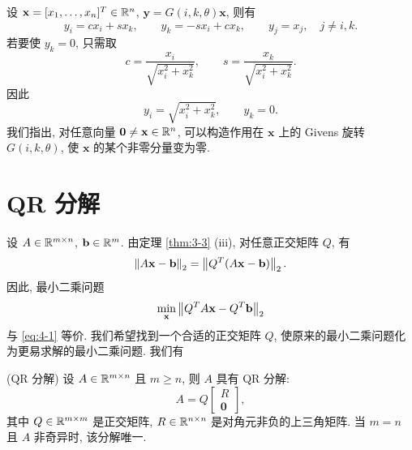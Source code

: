 设 $\mathbf{x}=[x_1,\ldots,x_n]^T\in\mathbb{R}^n$, $\mathbf{y}=G(i,k,\theta)\mathbf{x}$, 则有
\[
  y_i=cx_i+sx_k,\qquad y_k=-sx_i+cx_k,\qquad
  y_j=x_j,\quad j\neq i,k.
\]
若要使 $y_k=0$, 只需取
\[
  c=\frac{x_i}{\sqrt{x_i^2+x_k^2}},\qquad
  s=\frac{x_k}{\sqrt{x_i^2+x_k^2}}.
\]
因此
\[
  y_i=\sqrt{x_i^2+x_k^2},\qquad y_k=0.
\]
我们指出, 对任意向量 $\mathbf{0}\neq\mathbf{x}\in\mathbb{R}^n$, 可以构造作用在 $\mathbf{x}$ 上的 Givens 旋转 $G(i,k,\theta)$, 使 $\mathbf{x}$ 的某个非零分量变为零.

\section{QR 分解}
\label{sec:4-3}

设 $A\in\mathbb{R}^{m\times n}$, $\mathbf{b}\in\mathbb{R}^m$. 由定理 \ref{thm:3-3} (iii), 对任意正交矩阵 $Q$, 有
\[
  \left\|A\mathbf{x}-\mathbf{b}\right\|_2=\left\|Q^T(A\mathbf{x}-\mathbf{b})\right\|_2.
\]
因此, 最小二乘问题
\[
  \min_{\mathbf{x}}\left\|Q^TA\mathbf{x}-Q^T\mathbf{b}\right\|_2
\]
与 \eqref{eq:4-1} 等价. 我们希望找到一个合适的正交矩阵 $Q$, 使原来的最小二乘问题化为更易求解的最小二乘问题. 我们有

\begin{theorem}
\label{thm:4-9}
(QR 分解) 设 $A\in\mathbb{R}^{m\times n}$ 且 $m\geqslant n$, 则 $A$ 具有 QR 分解:
\begin{equation}
  A=Q
  \begin{bmatrix}
    R\\
    \mathbf{0}
  \end{bmatrix},
  \label{eq:4-8}
\end{equation}
其中 $Q\in\mathbb{R}^{m\times m}$ 是正交矩阵, $R\in\mathbb{R}^{n\times n}$ 是对角元非负的上三角矩阵. 当 $m=n$ 且 $A$ 非奇异时, 该分解唯一.
\end{theorem}

